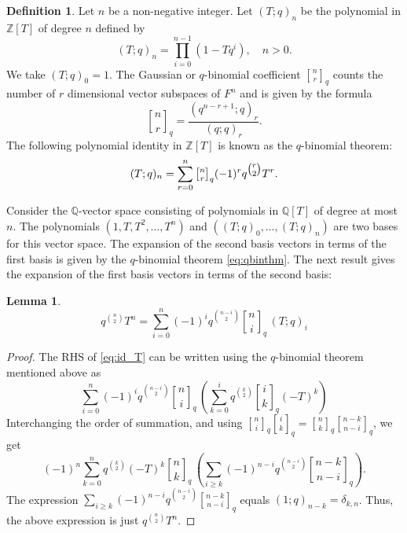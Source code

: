 \documentclass[reqno]{amsart}
\newtheorem{lemma}[theorem]{Lemma}
\theoremstyle{definition}
\newtheorem{definition}[theorem]{Definition}
\theoremstyle{remark}
\numberwithin{equation}{section}
\newcommand{\stirling}[2]{\genfrac{[}{]}{0pt}{1}{#1}{#2}}
\newcommand{\bZ}{\mathbb Z} \newcommand{\bQ}{\mathbb Q}
\begin{document}
\begin{definition} Let $n$ be a non-negative integer. Let $(T;q)_n$ be the  polynomial in $\bZ[T]$ of degree $n$  defined by
\[(T;q)_{n}= \prod\limits_{i=0}^{n-1}(1-Tq^{i}),\quad  n>0. \]
We take $(T;q)_0=1$.
The Gaussian or $q$-binomial coefficient 
 $\stirling{n}{r}_{q}$ counts the number of $r$ dimensional vector subspaces  of $F^n$ and is given by the formula
 \begin{equation}\label{binomial coefficient} \stirling{n}{r}_{q}= \frac{(q^{n-r+1};q)_r}{(q;q)_r}. 
 \end{equation}
The following polynomial identity in $\bZ[T]$ is known as the $q$-binomial theorem:
\begin{equation} \label{eq:qbinthm} (T;q)_{n}= \sum_{r=0}^{n}\stirling{n}{r}_{q}(-1)^{r}q^{\tbinom{r}{2}}T^{r}.\end{equation}
\end{definition}
Consider the $\bQ$-vector space  consisting of polynomials in $\bQ[T]$ of degree at most $n$. The polynomials 
$(1,T,T^2, \dots, T^n)$ and $((T;q)_0, \dots, (T;q)_n)$
are two  bases for this vector space. 
The expansion of the second basis vectors in terms of the first basis is given by the $q$-binomial theorem \eqref{eq:qbinthm}. The next result gives the expansion of the first basis vectors in terms of the second basis:
  \begin{lemma} \label{id_T}
\begin{equation} \label{eq:id_T}
q^{\binom{n}{2}} T^n = \sum_{i=0}^n  (-1)^i q^{ \binom{n-i}{2}} \stirling{n}{i}_q  \, (T;q)_i
\end{equation}
\end{lemma}
 \begin{proof}   The RHS of \eqref{eq:id_T}  can be written using the $q$-binomial theorem mentioned above as
\[ \sum_{i=0}^n  (-1)^i q^{ \binom{n-i}{2}} \stirling{n}{i}_q  \, ( \sum_{k=0}^i q^{\binom{k}{2}}\stirling{i}{k}_q  (-T)^k)
\]
Interchanging the order of summation, and using $\stirling{n}{i}_q \stirling{i}{k}_q = \stirling{n}{k}_q \stirling{n-k}{n-i}_q$, we get
\[ (-1)^n \sum_{k=0}^n q^{\binom{k}{2}}  (-T)^{k} \stirling{n}{k}_q     \, ( \sum_{i \geq k} (-1)^{n-i} q^{ \binom{n-i}{2}} \stirling{n-k}{n-i}_q ).
\]
The expression $\displaystyle \sum_{i \geq k} (-1)^{n-i}  q^{ \binom{n-i}{2}} \stirling{n-k}{n-i}_q$ equals $(1;q)_{n-k} = \delta_{k,n}$. Thus, the above expression is just $q^{\binom{n}{2}}  T^n$.
\end{proof} 
\end{document}
